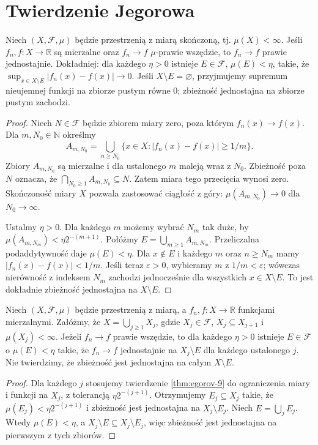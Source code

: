 \section{Twierdzenie Jegorowa}

\begin{twierdzenie}[Jegorow]
\label{thm:egorov-9}
Niech $(X,\mathcal F,\mu)$ będzie przestrzenią z miarą
skończoną, tj. $\mu(X)<\infty$. Jeśli
$f_n,f:X\to\mathbb R$ są mierzalne oraz
$f_n\to f$ $\mu$-prawie wszędzie, to
$f_n\to f$ prawie jednostajnie. Dokładniej: dla każdego
$\eta>0$ istnieje $E\in\mathcal F$, $\mu(E)<\eta$,
takie, że
$\sup_{x\in X\setminus E}|f_n(x)-f(x)|\to0$.
Jeśli $X\setminus E=\varnothing$, przyjmujemy supremum
nieujemnej funkcji na zbiorze pustym równe $0$;
zbieżność jednostajna na zbiorze pustym zachodzi.
\end{twierdzenie}
\begin{proof}
Niech $N\in\mathcal F$ będzie zbiorem miary zero,
poza którym $f_n(x)\to f(x)$. Dla $m,N_0\in\mathbb N$
określmy
\[
A_{m,N_0}=\bigcup_{n\ge N_0}
\{x\in X:|f_n(x)-f(x)|\ge1/m\}.
\]
Zbiory $A_{m,N_0}$ są mierzalne i dla ustalonego $m$
maleją wraz z $N_0$. Zbieżność poza $N$ oznacza,
że $\bigcap_{N_0\ge1}A_{m,N_0}\subseteq N$.
Zatem miara tego przecięcia wynosi zero. Skończoność
miary $X$ pozwala zastosować ciągłość z góry:
$\mu(A_{m,N_0})\to0$ dla $N_0\to\infty$.

Ustalmy $\eta>0$. Dla każdego $m$ możemy wybrać
$N_m$ tak duże, by
$\mu(A_{m,N_m})<\eta 2^{-(m+1)}$.
Połóżmy $E=\bigcup_{m\ge1}A_{m,N_m}$.
Przeliczalna podaddytywność daje
$\mu(E)<\eta$.
Dla $x\notin E$ i każdego $m$ oraz $n\ge N_m$
mamy $|f_n(x)-f(x)|<1/m$. Jeśli teraz
$\varepsilon>0$, wybieramy $m$ z $1/m<\varepsilon$;
wówczas nierówność z indeksem $N_m$ zachodzi
jednocześnie dla wszystkich $x\in X\setminus E$.
To jest dokładnie zbieżność jednostajna na
$X\setminus E$.
\end{proof}

\begin{wniosek}
\label{cor:local-egorov-9}
Niech $(X,\mathcal F,\mu)$ będzie przestrzenią z miarą,
a $f_n,f:X\to\mathbb R$ funkcjami mierzalnymi.
Załóżmy, że $X=\bigcup_{j\ge1}X_j$, gdzie $X_j\in\mathcal F$,
$X_j\subseteq X_{j+1}$ i $\mu(X_j)<\infty$.
Jeżeli $f_n\to f$ prawie wszędzie, to dla każdego
$\eta>0$ istnieje $E\in\mathcal F$ o $\mu(E)<\eta$
takie, że $f_n\to f$ jednostajnie na
$X_j\setminus E$ dla każdego ustalonego $j$.
Nie twierdzimy, że zbieżność jest jednostajna
na całym $X\setminus E$.
\end{wniosek}
\begin{proof}
Dla każdego $j$ stosujemy twierdzenie
\ref{thm:egorov-9} do ograniczenia miary i funkcji
na $X_j$, z tolerancją $\eta 2^{-(j+1)}$.
Otrzymujemy $E_j\subseteq X_j$ takie, że
$\mu(E_j)<\eta 2^{-(j+1)}$ i zbieżność jest
jednostajna na $X_j\setminus E_j$.
Niech $E=\bigcup_jE_j$. Wtedy $\mu(E)<\eta$, a
$X_j\setminus E\subseteq X_j\setminus E_j$,
więc zbieżność jest jednostajna na pierwszym z tych
zbiorów.
\end{proof}

